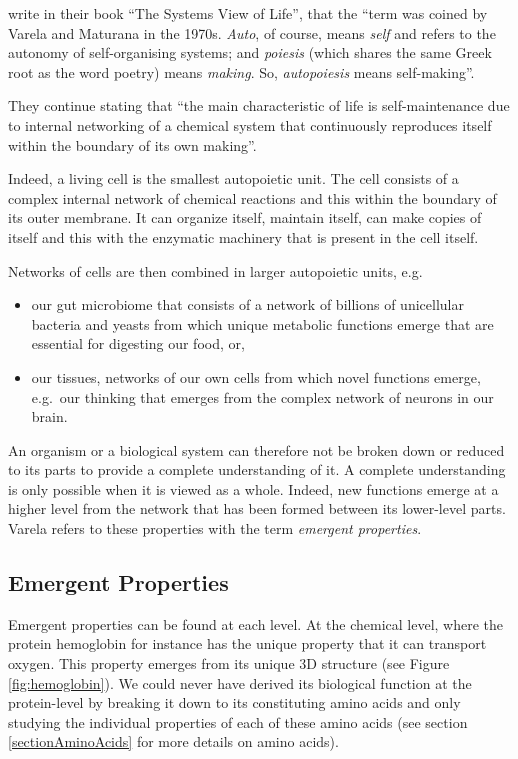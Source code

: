 \documentclass[
  11pt,
]{book}
\providecommand{\tightlist}{%
  \setlength{\itemsep}{0pt}\setlength{\parskip}{0pt}}
\begin{document}
\citet{capraLuisi2014} write in their book ``The Systems View of Life'', that the ``term was coined by Varela and Maturana in the 1970s. \emph{Auto}, of course, means \emph{self} and refers to the autonomy of self-organising systems; and \emph{poiesis} (which shares the same Greek root as the word poetry) means \emph{making}. So, \emph{autopoiesis} means self-making''.

They continue stating that ``the main characteristic of life is self-maintenance due to internal networking of a chemical system that continuously reproduces itself within the boundary of its own making''.

Indeed, a living cell is the smallest autopoietic unit.
The cell consists of a complex internal network of chemical reactions and this within the boundary of its outer membrane.
It can organize itself, maintain itself, can make copies of itself and this with the enzymatic machinery that is present in the cell itself.

Networks of cells are then combined in larger autopoietic units, e.g.~

\begin{itemize}
\tightlist
\item
  our gut microbiome that consists of a network of billions of unicellular bacteria and yeasts from which unique metabolic functions emerge that are essential for digesting our food, or,
\item
  our tissues, networks of our own cells from which novel functions emerge, e.g.~our thinking that emerges from the complex network of neurons in our brain.
\end{itemize}

An organism or a biological system can therefore not be broken down or reduced to its parts to provide a complete understanding of it. A complete understanding is only possible when it is viewed as a whole.
Indeed, new functions emerge at a higher level from the network that has been formed between its lower-level parts. Varela refers to these properties with the term \emph{emergent properties}.

\hypertarget{emergent-properties}{%
\subsection{Emergent Properties}\label{emergent-properties}}

Emergent properties can be found at each level. At the chemical level, where the protein hemoglobin for instance has the unique property that it can transport oxygen. This property emerges from its unique 3D structure (see Figure \ref{fig:hemoglobin}). We could never have derived its biological function at the protein-level by breaking it down to its constituting amino acids and only studying the individual properties of each of these amino acids (see section \ref{sectionAminoAcids} for more details on amino acids).
\end{document}
